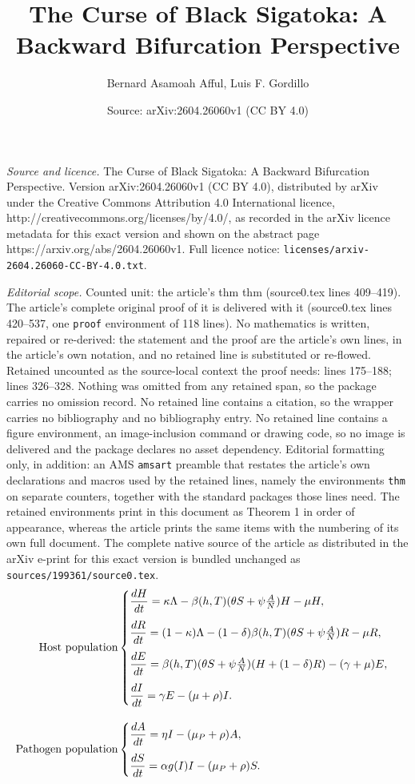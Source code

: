 \documentclass[10pt,a4paper]{amsart}
\title{The Curse of Black Sigatoka: A Backward Bifurcation Perspective}
\author{Bernard Asamoah Afful, Luis F. Gordillo}
\date{Source: arXiv:2604.26060v1 (CC BY 4.0)}
\begin{document}
\maketitle

\noindent\emph{Source and licence.} The Curse of Black Sigatoka: A Backward Bifurcation Perspective. Version arXiv:2604.26060v1 (CC BY 4.0), distributed by arXiv under the Creative Commons Attribution 4.0 International licence, http://creativecommons.org/licenses/by/4.0/, as recorded in the arXiv licence metadata for this exact version and shown on the abstract page https://arxiv.org/abs/2604.26060v1. Full licence notice: \texttt{licenses/arxiv-2604.26060-CC-BY-4.0.txt}.\par\smallskip

\noindent\textit{Editorial scope.} Counted unit: the article's thm thm (source0.tex lines 409--419). The article's complete original proof of it is delivered with it (source0.tex lines 420--537, one \texttt{proof} environment of 118 lines). No mathematics is written, repaired or re-derived: the statement and the proof are the article's own lines, in the article's own notation, and no retained line is substituted or re-flowed.  Retained uncounted as the source-local context the proof needs: lines 175--188; lines 326--328.  Nothing was omitted from any retained span, so the package carries no omission record.  No retained line contains a citation, so the wrapper carries no bibliography and no bibliography entry.  No retained line contains a figure environment, an image-inclusion command or drawing code, so no image is delivered and the package declares no asset dependency.  Editorial formatting only, in addition: an AMS \texttt{amsart} preamble that restates the article's own declarations and macros used by the retained lines, namely the environments \texttt{thm} on separate counters, together with the standard packages those lines need.  The retained environments print in this document as Theorem 1 in order of appearance, whereas the article prints the same items with the numbering of its own full document.  The complete native source of the article as distributed in the arXiv e-print for this exact version is bundled unchanged as \texttt{sources/199361/source0.tex}.
\begin{align}\label{eqn1}
    \text{\textbf{Host population}}&
    \begin{cases}
        \dfrac{dH}{dt}=\kappa\Lambda - \beta(h,T)(\theta S+\psi\frac{A}{N})H - \mu H,\\[10pt]
	\dfrac{dR}{dt}=(1-\kappa)\Lambda - (1-\delta)\beta(h,T)(\theta S+\psi\frac{A}{N})R - \mu R,\\[10pt]
	\dfrac{dE}{dt}=\beta(h,T)(\theta S+\psi \frac{A}{N})(H+(1-\delta)R) - (\gamma+\mu)E,\\[10pt]
	\dfrac{dI}{dt}=\gamma E - (\mu+\rho)I.
    \end{cases}\\[10pt]
    \text{\textbf{Pathogen population}}&
    \begin{cases}
        \dfrac{dA}{dt}=\eta I - (\mu_P+\rho)A,\\[10pt]
	\dfrac{dS}{dt}=\alpha g(I)I - (\mu_P+\rho)S.
    \end{cases}
\end{align}
\end{document}

